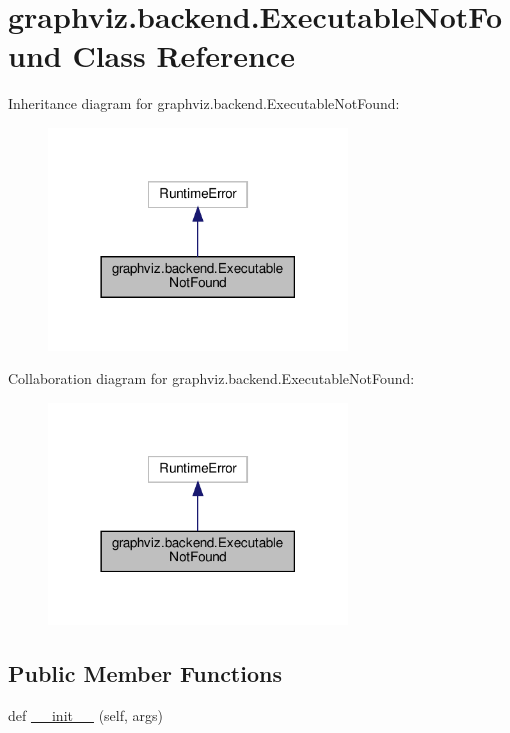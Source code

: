 \hypertarget{classgraphviz_1_1backend_1_1ExecutableNotFound}{}\section{graphviz.\+backend.\+Executable\+Not\+Found Class Reference}
\label{classgraphviz_1_1backend_1_1ExecutableNotFound}


Inheritance diagram for graphviz.\+backend.\+Executable\+Not\+Found\+:
\nopagebreak
\begin{figure}[H]
\begin{center}
\leavevmode
\includegraphics[width=225pt]{classgraphviz_1_1backend_1_1ExecutableNotFound__inherit__graph}
\end{center}
\end{figure}


Collaboration diagram for graphviz.\+backend.\+Executable\+Not\+Found\+:
\nopagebreak
\begin{figure}[H]
\begin{center}
\leavevmode
\includegraphics[width=225pt]{classgraphviz_1_1backend_1_1ExecutableNotFound__coll__graph}
\end{center}
\end{figure}
\subsection*{Public Member Functions}
\begin{DoxyCompactItemize}
\item 
def \hyperlink{classgraphviz_1_1backend_1_1ExecutableNotFound_acca85f580feb59bede5e90e8cf5450e9}{\+\_\+\+\_\+init\+\_\+\+\_\+} (self, args)
\end{DoxyCompactItemize}


